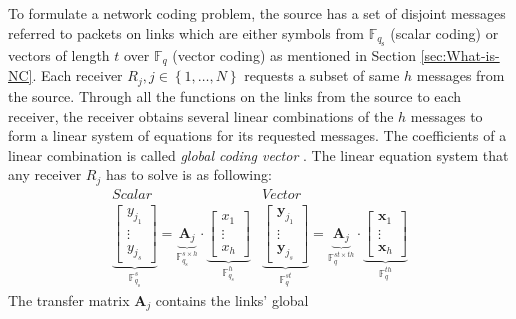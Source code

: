 To formulate a network coding problem, the source has a set of disjoint
messages referred to packets on links which are either symbols from
$\ensuremath{\mathbb{F}}_{q_{\mathrm{s}}}$ (scalar coding) or vectors
of length $t$ over $\ensuremath{\mathbb{F}}_{q}$ (vector coding)
as mentioned in Section \ref{sec:What-is-NC}. Each receiver $R_{j},j\in\left\{ 1,\ldots,N\right\} $
requests a subset of same $h$ messages from the source. Through all
the functions on the links from the source to each receiver, the receiver
obtains several linear combinations of the $h$ messages to form a
linear system of equations for its requested messages. The coefficients
of a linear combination is called \textit{global coding vector} \cite{Sanders:2003}.
The linear equation system that any receiver $R_{j}$ has to solve
is as following:
\begin{equation}
\begin{array}{c|c}
Scalar & Vector\\
\underset{\ensuremath{\mathbb{F}}_{q_{\mathrm{s}}}^{s}}{\underbrace{\left[\begin{array}{c}
y_{j_{1}}\\
\vdots\\
y_{j_{s}}
\end{array}\right]}}=\underset{\ensuremath{\mathbb{F}}_{q_{\mathrm{s}}}^{s\times h}}{\underbrace{\boldsymbol{A}_{j}}}\cdot\underset{\ensuremath{\mathbb{F}}_{q_{s}}^{h}}{\underbrace{\left[\begin{array}{c}
x_{1}\\
\vdots\\
x_{h}
\end{array}\right]}} & \underset{\ensuremath{\mathbb{F}}_{q}^{st}}{\underbrace{\left[\begin{array}{c}
\boldsymbol{y}_{j_{1}}\\
\vdots\\
\boldsymbol{y}_{j_{s}}
\end{array}\right]}}=\underset{\ensuremath{\mathbb{F}}_{q}^{st\times th}}{\underbrace{\boldsymbol{A}_{j}}}\cdot\underset{\ensuremath{\mathbb{F}}_{q}^{th}}{\underbrace{\left[\begin{array}{c}
\boldsymbol{x}_{1}\\
\vdots\\
\boldsymbol{x}_{h}
\end{array}\right]}}
\end{array}\label{eq:linear_system}
\end{equation}
The transfer matrix $\boldsymbol{A}_{j}$ contains the links' global

